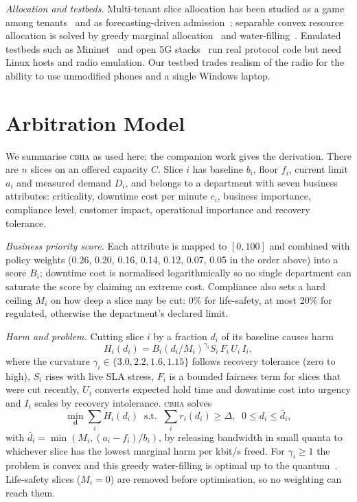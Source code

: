 \documentclass[conference]{IEEEtran}
\newcommand{\cbha}{\textsc{cbha}}
\begin{document}
\textit{Allocation and testbeds.} Multi-tenant slice allocation has been studied as a game among tenants~\cite{caballero2019} and as forecasting-driven admission~\cite{sciancalepore2017}; separable convex resource allocation is solved by greedy marginal allocation~\cite{ibaraki1988} and water-filling~\cite{palomar2005}. Emulated testbeds such as Mininet~\cite{lantz2010} and open 5G stacks~\cite{open5gs,ueransim} run real protocol code but need Linux hosts and radio emulation. Our testbed trades realism of the radio for the ability to use unmodified phones and a single Windows laptop.

\section{Arbitration Model}
\label{sec:model}

We summarise \cbha{} as used here; the companion work gives the derivation. There are $n$ slices on an offered capacity $C$. Slice $i$ has baseline $b_i$, floor $f_i$, current limit $a_i$ and measured demand $D_i$, and belongs to a department with seven business attributes: criticality, downtime cost per minute $c_i$, business importance, compliance level, customer impact, operational importance and recovery tolerance.

\textit{Business priority score.} Each attribute is mapped to $[0,100]$ and combined with policy weights (0.26, 0.20, 0.16, 0.14, 0.12, 0.07, 0.05 in the order above) into a score $B_i$; downtime cost is normalised logarithmically so no single department can saturate the score by claiming an extreme cost. Compliance also sets a hard ceiling $M_i$ on how deep a slice may be cut: 0\% for life-safety, at most 20\% for regulated, otherwise the department's declared limit.

\textit{Harm and problem.} Cutting slice $i$ by a fraction $d_i$ of its baseline causes harm
\begin{equation}
H_i(d_i) = B_i \left(d_i / M_i\right)^{\gamma_i} S_i\, F_i\, U_i\, I_i ,
\label{eq:harm}
\end{equation}
where the curvature $\gamma_i \in \{3.0, 2.2, 1.6, 1.15\}$ follows recovery tolerance (zero to high), $S_i$ rises with live SLA stress, $F_i$ is a bounded fairness term for slices that were cut recently, $U_i$ converts expected hold time and downtime cost into urgency and $I_i$ scales by recovery intolerance. \cbha{} solves
\begin{equation}
\min_{\mathbf d} \textstyle\sum_i H_i(d_i) \;\; \text{s.t.} \;\; \sum_i r_i(d_i) \ge \Delta, \;\; 0 \le d_i \le \bar d_i ,
\label{eq:p1}
\end{equation}
with $\bar d_i = \min(M_i, (a_i - f_i)/b_i)$, by releasing bandwidth in small quanta to whichever slice has the lowest marginal harm per kbit/s freed. For $\gamma_i \ge 1$ the problem is convex and this greedy water-filling is optimal up to the quantum~\cite{ibaraki1988,boyd2004}. Life-safety slices ($M_i = 0$) are removed before optimisation, so no weighting can reach them.
\end{document}
